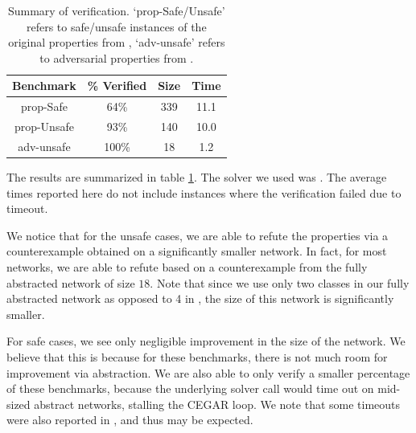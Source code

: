 \begin{table}
\begin{tabular}{ |c|c|c|c| }
\hline
Benchmark   & \% Verified & Size     & Time \\ 
\hline
prop-Safe   &   64\%      & 339      & 11.1  \\
prop-Unsafe &   93\%      & 140      & 10.0  \\
adv-unsafe  &  100\%      & 18       & 1.2   \\
\hline                                                                
\end{tabular}
\caption{Summary of \acasxu verification. `prop-Safe/Unsafe' refers to
safe/unsafe instances of the original properties from \cite{reluplex},
`adv-unsafe' refers to adversarial properties from \cite{cegar-nn}. }
\label{t:acas-verif}
\end{table}

The results are summarized in table \ref{t:acas-verif}. The solver we used was
\abcrown. The average times reported here do not include instances where the
verification failed due to timeout.

We notice that for the unsafe cases, we are able to refute the
properties via a counterexample obtained on a significantly smaller network. In
fact, for most networks, we are able to refute based on a counterexample from
the fully abstracted network of size $18$. Note that since we use only two classes in our
fully abstracted network as opposed to 4 in \cite{cegar-nn}, the size of this
network is significantly smaller. 

For safe cases, we see only negligible improvement in the size of the network.
We believe that this is because for these benchmarks, there is not much room for
improvement via abstraction. We are also able to only verify a smaller
percentage of these benchmarks, because the underlying solver call would time
out on mid-sized abstract networks, stalling
the CEGAR loop. We note that some timeouts were also reported in
\cite{cegar-nn}, and thus may be expected.

